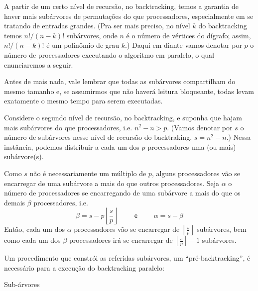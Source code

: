 \documentclass[a4paper,article,10pt]{article}
\newcommand{\e}{\textsf{ e }}
\newcommand{\floor}[1] {\left \lfloor {#1} \right \rfloor}
\newcommand{\floorfrac}[2] {\floor{\frac{#1}{#2}}}
\begin{document}
    A partir de um certo nível de recursão, no backtracking, temos a garantia de
    haver mais subárvores de permutações do que processadores, especialmente
    em se tratando de entradas grandes.
    (Pra ser mais preciso, no nível $k$ do backtracking temos $n! / (n-k)!$
    subárvores, onde $n$ é o número de vértices do dígrafo; assim,
    $n! / (n-k)!$ é um polinômio de grau $k$.)
    Daqui em diante vamos denotar por $p$ o número de processadores executando o
    algoritmo em paralelo, o qual enunciaremos a seguir.

    Antes de mais nada, vale lembrar que todas as subárvores compartilham do
    mesmo tamanho e, se assumirmos que não haverá leitura bloqueante, todas
    levam exatamente o mesmo tempo para serem executadas.

    Considere o segundo nível de recursão, no backtracking, e suponha que hajam
    mais subárvores do que processadores, i.e. $n^2-n > p$. 
    (Vamos denotar por $s$ o número de subárvores nesse nível de recursão do
    backtraking, $s = n^2-n$.)
    Nessa instância, podemos distribuir a cada um dos $p$ processadores uma (ou
    mais) subárvore(s). 

    Como $s$ não é necessariamente um múltiplo de $p$, alguns processadores vão
    se encarregar de uma subárvore a mais do que outros processadores.
    Seja $\alpha$ o número de processadores se encarregando de uma subárvore a
    mais do que os demais $\beta$ processadores, i.e.
    \begin{equation*}
      \beta = s - p \floorfrac{s}{p}
      \qquad \e \qquad
      \alpha = s - \beta
    \end{equation*}
    Então, cada um dos $\alpha$ processadores vão se encarregar de
    $\floorfrac{s}{p}$ subárvores, bem como cada um dos $\beta$
    processadores irá se encarregar de $\floorfrac{s}{p}-1$ subárvores.

    Um procedimento que constrói as referidas subárvores, um
    ``pré-backtracking'', é necessário para a execução do backtracking paralelo:

    \begin{algorithm}[H]
      \caption{\sc Sub-árvores}
      
      
      
    \end{algorithm}
      
\end{document}
